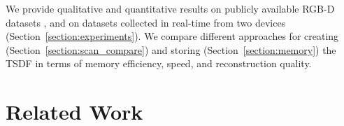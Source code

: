 \documentclass[conference]{IEEEtran}
\newcommand{\sref}[1]{Section~\ref{#1}}
\begin{document}
 We provide qualitative and  quantitative results on publicly available RGB-D
 datasets \cite{FREIBURG}, and on datasets collected in real-time from two
 devices (\sref{section:experiments}). We compare different approaches for
 creating (\sref{section:scan_compare}) and storing (\sref{section:memory}) the
 TSDF in terms of memory efficiency, speed, and reconstruction quality.

\section{Related Work}
\end{document}
